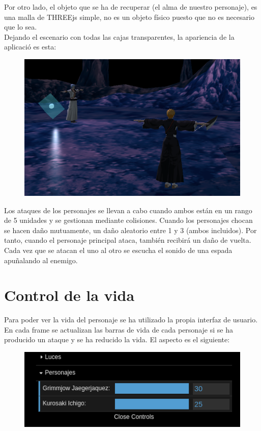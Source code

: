 \documentclass[11pt,a4paper]{article}
\begin{document}
Por otro lado, el objeto que se ha de recuperar (el alma de nuestro personaje), es una malla de THREEjs simple, no es un objeto físico puesto que no es necesario que lo sea.\\

Dejando el escenario con todas las cajas transparentes, la apariencia de la aplicació es esta:

\begin{figure}[H]
	\centering
	\includegraphics[scale=0.37]{img/inicio.png}
\end{figure}

Los ataques de los personajes se llevan a cabo cuando ambos están en un rango de 5 unidades y se gestionan mediante colisiones. Cuando los personajes chocan se hacen daño mutuamente, un daño aleatorio entre 1 y 3 (ambos incluidos). Por tanto, cuando el personaje principal ataca, también recibirá un daño de vuelta. Cada vez que se atacan el uno al otro se escucha el sonido de una espada apuñalando al enemigo.

\section{Control de la vida}

Para poder ver la vida del personaje se ha utilizado la propia interfaz de usuario. En cada frame se actualizan las barras de vida de cada personaje si se ha producido un ataque y se ha reducido la vida. El aspecto es el siguiente:

\begin{figure}[H]
	\centering
	\includegraphics[scale=0.5]{img/barravida.png}
\end{figure}
\end{document}
